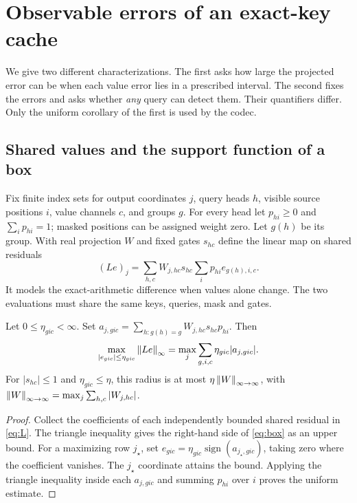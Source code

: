\section{Observable errors of an exact-key cache}
\label{app:math}
We give two different characterizations. The first asks how large the projected error can be when each value error lies in a prescribed interval. The second fixes the errors and asks whether \emph{any} query can detect them. Their quantifiers differ. Only the uniform corollary of the first is used by the codec.

\subsection{Shared values and the support function of a box}
Fix finite index sets for output coordinates $j$, query heads $h$, visible source positions $i$, value channels $c$, and groups $g$. For every head let $p_{hi}\ge0$ and $\sum_i p_{hi}=1$; masked positions can be assigned weight zero. Let $g(h)$ be its group. With real projection $W$ and fixed gates $s_{hc}$ define the linear map on shared residuals
\begin{equation}
 (Le)_j=\sum_{h,c}W_{j,hc}s_{hc}\sum_i p_{hi}e_{g(h),i,c}.
 \label{eq:L}
\end{equation}
It models the exact-arithmetic difference when values alone change. The two evaluations must share the same keys, queries, mask and gates.

\begin{theorem}\label{thm:box}
Let $0\le\eta_{gic}<\infty$. Set $a_{j,gic}=\sum_{h:g(h)=g}W_{j,hc}s_{hc}p_{hi}$. Then
\begin{equation}
 \max_{|e_{gic}|\le\eta_{gic}}\left\lVert Le\right\rVert_\infty
 =\max_j\sum_{g,i,c}\eta_{gic}|a_{j,gic}|.
 \label{eq:box}
\end{equation}
For $|s_{hc}|\le1$ and $\eta_{gic}\le\eta$, this radius is at most $\eta\left\lVert W\right\rVert_{\infty\to\infty}$, with $\left\lVert W\right\rVert_{\infty\to\infty}=\max_j\sum_{h,c}|W_{j,hc}|$.
\end{theorem}
\begin{proof}
Collect the coefficients of each independently bounded shared residual in \eqref{eq:L}. The triangle inequality gives the right-hand side of \eqref{eq:box} as an upper bound. For a maximizing row $j_\star$, set $e_{gic}=\eta_{gic}\operatorname{sign}(a_{j_\star,gic})$, taking zero where the coefficient vanishes. The $j_\star$ coordinate attains the bound. Applying the triangle inequality inside each $a_{j,gic}$ and summing $p_{hi}$ over $i$ proves the uniform estimate.
\end{proof}

